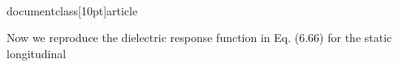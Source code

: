 \\documentclass[10pt]{article}
\begin{document}
{{{{Now we reproduce the dielectric response function in Eq. (6.66) for the static longitudinal }}}}
\end{document}
